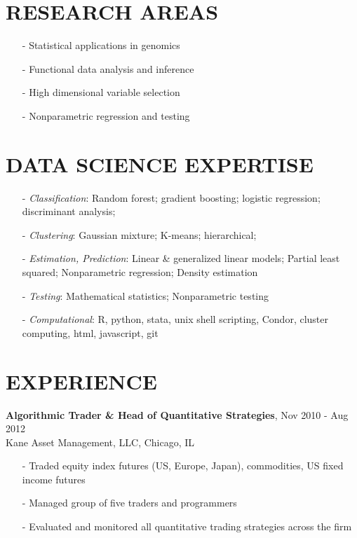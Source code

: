 \documentclass[11pt]{res} %
\begin{document}
\begin{resume}
\section{RESEARCH AREAS} 
\begin{itemize}[leftmargin=*] \itemsep -2pt %
\item[-]Statistical applications in genomics
\item[-]Functional data analysis and inference 
\item[-]High dimensional variable selection
\item[-]Nonparametric regression and testing
\end{itemize}

\section{DATA SCIENCE EXPERTISE} 
\begin{itemize}[leftmargin=*]
\item[-] {\emph{Classification}}: Random forest; gradient boosting; logistic regression; discriminant analysis;
\item[-] {\emph{Clustering}}: Gaussian mixture; K-means; hierarchical; 
\item[-] {\emph{Estimation, Prediction}}: Linear \& generalized linear models; Partial least squared; Nonparametric regression; Density estimation
\item[-] {\emph{Testing}}: Mathematical statistics; Nonparametric testing
\item[-] {\emph{Computational}}: R, python, stata, unix shell scripting, Condor, cluster computing, html, javascript, git
\end{itemize}

\section{EXPERIENCE} 
{\bf{Algorithmic Trader \& Head of Quantitative Strategies}}, \hfill Nov 2010 - Aug 2012 \\
Kane Asset Management, LLC, Chicago, IL
   \begin{itemize} \itemsep -2pt %
   \item[-] Traded equity index futures (US, Europe, Japan), commodities, US fixed income futures
   \item[-] Managed group of five traders and programmers
   \item[-] Evaluated and monitored all quantitative trading strategies across the firm
   \end{itemize}


\end{resume}
\end{document}
